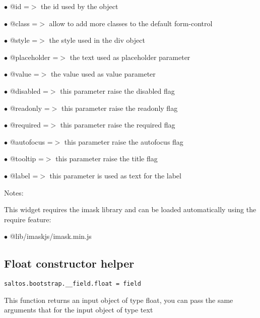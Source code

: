 \documentclass[a4paper]{book}
\begin{document}
\begin{compactitem}
\item[\color{myblue}$\bullet$] @id          =$>$ the id used by the object
\item[\color{myblue}$\bullet$] @class       =$>$ allow to add more classes to the default form-control
\item[\color{myblue}$\bullet$] @style       =$>$ the style used in the div object
\item[\color{myblue}$\bullet$] @placeholder =$>$ the text used as placeholder parameter
\item[\color{myblue}$\bullet$] @value       =$>$ the value used as value parameter
\item[\color{myblue}$\bullet$] @disabled    =$>$ this parameter raise the disabled flag
\item[\color{myblue}$\bullet$] @readonly    =$>$ this parameter raise the readonly flag
\item[\color{myblue}$\bullet$] @required    =$>$ this parameter raise the required flag
\item[\color{myblue}$\bullet$] @autofocus   =$>$ this parameter raise the autofocus flag
\item[\color{myblue}$\bullet$] @tooltip     =$>$ this parameter raise the title flag
\item[\color{myblue}$\bullet$] @label       =$>$ this parameter is used as text for the label
\end{compactitem}

Notes:

This widget requires the imask library and can be loaded automatically using the require
feature:

\begin{compactitem}
\item[\color{myblue}$\bullet$] @lib/imaskjs/imask.min.js
\end{compactitem}

\hypertarget{toc438}{}
\subsection{Float constructor helper}

\begin{lstlisting}
saltos.bootstrap.__field.float = field
\end{lstlisting}

This function returns an input object of type float, you can pass the same arguments
that for the input object of type text
\end{document}
